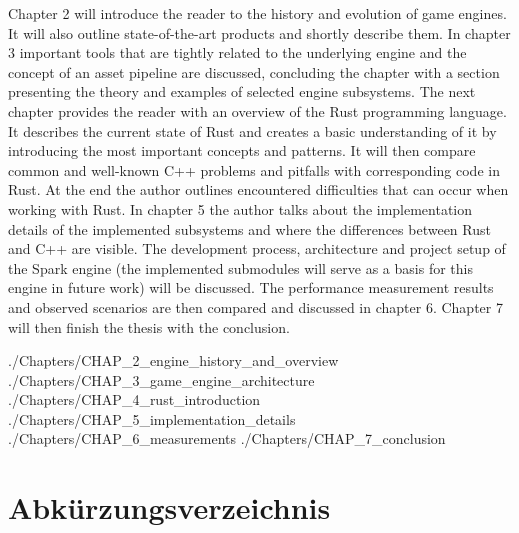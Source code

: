 \documentclass[MGS, Master, english]{twbook}
\providecommand\listacroname{}
\renewcommand\listacroname{List of Abbreviations}
\renewcommand\listacroname{Abkürzungsverzeichnis}
\newcommand{\listofcode}{\phantomsection\lstlistoflistings}
\begin{document}
Chapter 2 will introduce the reader to the history and evolution of game engines. It will also outline state-of-the-art products and shortly describe them. In chapter 3 important tools that are tightly related to the underlying engine and the concept of an asset pipeline are discussed, concluding the chapter with a section presenting the theory and examples of selected engine subsystems.
The next chapter provides the reader with an overview of the Rust programming language. It describes the current state of Rust and creates a basic understanding of it by introducing the most important concepts and patterns. It will then compare common and well-known C++ problems and pitfalls with corresponding code in Rust. At the end the author outlines encountered difficulties that can occur when working with Rust. 
In chapter 5 the author talks about the implementation details of the implemented subsystems and where the differences between Rust and C++ are visible. The development process, architecture and project setup of the Spark engine (the implemented submodules will serve as a basis for this engine in future work) will be discussed. The performance measurement results and observed scenarios are then compared and discussed in chapter 6. Chapter 7 will then finish the thesis with the conclusion.

 {./Chapters/CHAP_2_engine_history_and_overview}
 {./Chapters/CHAP_3_game_engine_architecture}
 {./Chapters/CHAP_4_rust_introduction}
 {./Chapters/CHAP_5_implementation_details}
 {./Chapters/CHAP_6_measurements}
 {./Chapters/CHAP_7_conclusion}

%
%
\clearpage
\nocite{GEA_2}
\nocite{C_Lan}
\nocite{ProRus}
\nocite{GEG_3}
\nocite{Portisch17}


\clearpage
\listoffigures
\clearpage

\listoftables
\clearpage

\listofcode
\clearpage

\addcontentsline{toc}{chapter}{\listacroname}
\chapter*{\listacroname}
\begin{acronym}[]
\end{acronym}
\end{document}

